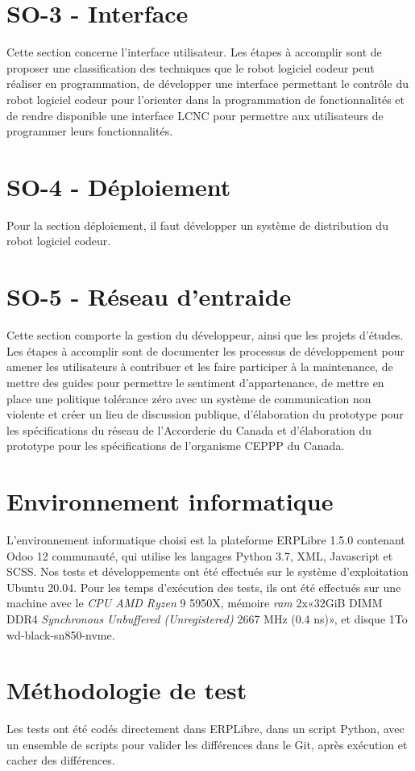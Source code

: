 \section{SO-3 - Interface}
Cette section concerne l'interface utilisateur. Les étapes à accomplir sont de proposer une classification des techniques que le robot logiciel codeur peut réaliser en programmation, de développer une interface permettant le contrôle du robot logiciel codeur pour l’orienter dans la programmation de fonctionnalités et de rendre disponible une interface LCNC pour permettre aux utilisateurs de programmer leurs fonctionnalités.

\section{SO-4 - Déploiement}
Pour la section déploiement, il faut développer un système de distribution du robot logiciel codeur.

\section{SO-5 - Réseau d’entraide}
Cette section comporte la gestion du développeur, ainsi que les projets d'études. Les étapes à accomplir sont de documenter les processus de développement pour amener les utilisateurs à contribuer et les faire participer à la maintenance, de mettre des guides pour permettre le sentiment d'appartenance, de mettre en place une politique tolérance zéro avec un système de communication non violente et créer un lieu de discussion publique, d'élaboration du prototype pour les spécifications du réseau de l’Accorderie du Canada et d'élaboration du prototype pour les spécifications de l’organisme CEPPP du Canada.

\section{Environnement informatique}
L'environnement informatique choisi est la plateforme ERPLibre 1.5.0 contenant Odoo 12 communauté, qui utilise les langages Python 3.7, XML, Javascript et SCSS. Nos tests et développements ont été effectués sur le système d’exploitation Ubuntu 20.04.
Pour les temps d’exécution des tests, ils ont été effectués sur une machine avec le \textit{CPU AMD Ryzen} 9 5950X, mémoire \textit{ram} 2x«32GiB DIMM DDR4 \textit{Synchronous Unbuffered (Unregistered)} 2667 MHz (0.4 ns)», et disque 1To wd-black-sn850-nvme.

\section{Méthodologie de test}
Les tests ont été codés directement dans ERPLibre, dans un script Python, avec un ensemble de scripts pour valider les différences dans le Git, après exécution et cacher des différences.


